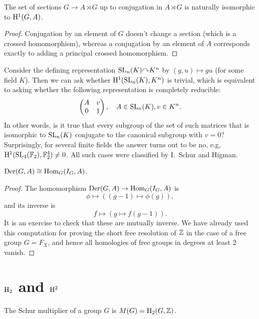 \begin{cor}
    The set of sections $G\to A\rtimes G$ up to conjugation in $A\rtimes G$ is naturally isomorphic to $\mathrm{H}^1(G,A)$.
\end{cor}
\begin{proof}
    Conjugation by an element of $G$ doesn't change a section (which is a crossed homomorphism), whereas a conjugation by an element of $A$ corresponds exactly to adding a principal crossed homomorphism.
\end{proof}

\begin{example}
    Consider the defining representation $\SL_n(K)\acts K^n$ by $(g,u)\mapsto gu$ (for some field $K$). Then we can ask whether $\mathrm{H}^1(\operatorname{SL}_n(K),K^n)$ is trivial, which is equivalent to asking whether the following representation is completely reducible:
    \[\begin{pmatrix}
        A&v\\
        0&1
    \end{pmatrix},\quad A\in \operatorname{SL}_n(K),v\in K^n.\]
    In other words, is it true that every subgroup of the set of such matrices that is isomorphic to $\operatorname{SL}_n(K)$ conjugate to the canonical subgroup with $v=0$? Surprisingly, for several finite fields the answer turns out to be no, e.g, $\mathrm{H}^1(\operatorname{SL}_4(\mathbb{F}_2),\mathbb{F}_2^4)\neq 0$. All such cases were classified by I.~Schur and Higman.
\end{example}

\begin{defn}
    $\operatorname{Der}(G,A)\cong \operatorname{Hom}_G(I_G,A)$.
\end{defn}
\begin{proof}
    The homomorphism $\operatorname{Der}(G,A)\to \operatorname{Hom}_G(I_G,A)$ is
    \[\phi\mapsto ((g-1)\mapsto \phi(g)),\]
    and its inverse is
    \[f\mapsto (g\mapsto f(g-1)).\]
    It is an exercise to check that these are mutually inverse. We have already used this computation for proving the short free resolution of $\mathbb{Z}$ in the case of a free group $G=F_X$, and hence all homologies of free groups in degrees at least $2$ vanish.
\end{proof}

\section{\texorpdfstring{$\mathrm{H}_2$}{H2} and \texorpdfstring{$\mathrm{H}^2$}{H2}}


\begin{defn}
    The Schur multiplier of a group $G$ is $M(G)=\mathrm{H}_2(G,\mathbb{Z})$.
\end{defn}

